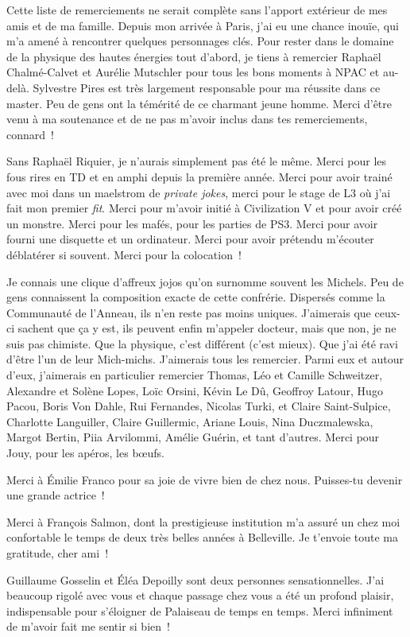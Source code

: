 Cette liste de remerciements ne serait complète sans l'apport
extérieur de mes amis et de ma famille. Depuis mon arrivée à Paris,
j'ai eu une chance inouïe, qui m'a amené à rencontrer quelques
personnages clés. Pour rester dans le domaine de la physique des
hautes énergies tout d'abord, je tiens à remercier 
Raphaël Chalmé-Calvet et Aurélie Mutschler pour tous les
bons moments à NPAC et au-delà. Sylvestre Pires est très largement
responsable pour ma réussite dans ce master. Peu de gens ont la
témérité de ce charmant jeune homme. Merci d'être venu à ma soutenance
et de ne pas m'avoir inclus dans tes remerciements, connard~!


Sans Raphaël Riquier, je n'aurais simplement pas été le même. Merci
pour les fous rires en TD et en amphi depuis la première année. Merci
pour avoir trainé avec moi dans un maelstrom de \textit{private
  jokes}, merci pour le stage de L3 où j'ai fait mon premier
\textit{fit}. Merci pour m'avoir initié à Civilization V et pour avoir
créé un monstre. Merci pour les mafés, pour les parties de PS3. Merci
pour avoir fourni une disquette et un ordinateur. Merci pour avoir
prétendu m'écouter déblatérer si souvent.  Merci pour la colocation~!


Je connais une clique d'affreux jojos qu'on surnomme souvent les
Michels. Peu de gens connaissent la composition exacte de cette
confrérie. Dispersés comme la Communauté de l'Anneau, ils n'en reste
pas moins uniques. J'aimerais que ceux-ci sachent que ça y est, ils
peuvent enfin m'appeler docteur, mais que non, je ne suis pas
chimiste. Que la physique, 
c'est différent (c'est mieux). Que j'ai été ravi d'être l'un de leur
Mich-michs. J'aimerais tous les remercier. Parmi eux et autour d'eux,
j'aimerais en particulier 
remercier Thomas, Léo et Camille Schweitzer, Alexandre et Solène
Lopes, Loïc Orsini, Kévin Le Dû, Geoffroy Latour, Hugo Pacou, Boris
Von Dahle, Rui Fernandes, Nicolas Turki, et Claire Saint-Sulpice,
Charlotte Languiller, Claire Guillermic, Ariane Louis, Nina
Duczmalewska, Margot Bertin, Piia Arvilommi, Amélie Guérin, et tant
d'autres. Merci pour Jouy, pour les apéros, les b\oe{}ufs. 


Merci à Émilie Franco pour sa joie de vivre bien de chez
nous. Puisses-tu devenir une grande actrice~!

Merci à François Salmon, dont la prestigieuse institution m'a assuré
un chez moi confortable le temps de deux très belles années à
Belleville. Je t'envoie toute ma gratitude, cher ami~!

Guillaume Gosselin et Éléa Depoilly sont deux personnes
sensationnelles. J'ai beaucoup rigolé avec vous et chaque passage chez vous a
été un profond plaisir, indispensable pour s'éloigner de Palaiseau de
temps en temps. Merci infiniment de m'avoir fait me sentir si bien~!


